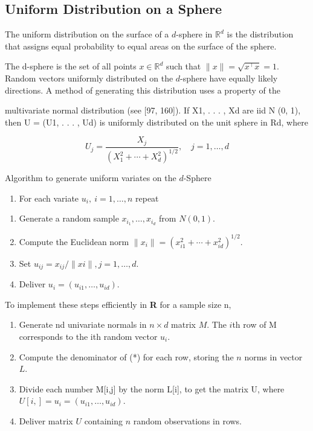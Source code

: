 \documentclass[
  letterpaper,
  DIV=11,
  numbers=noendperiod]{scrreprt}
\providecommand{\tightlist}{%
  \setlength{\itemsep}{0pt}\setlength{\parskip}{0pt}}
\begin{document}
\subsection{Uniform Distribution on a
Sphere}\label{uniform-distribution-on-a-sphere}

The uniform distribution on the surface of a \(d\)-sphere in
\(\mathbb{R}^d\) is the distribution that assigns equal probability to
equal areas on the surface of the sphere.

The d-sphere is the set of all points \(x \in \mathbb{R}^d\) such that
\(\| x \| = \sqrt{x^\top x} = 1\). Random vectors uniformly distributed
on the \(d\)-sphere have equally likely directions. A method of
generating this distribution uses a property of the

multivariate normal distribution (see {[}97, 160{]}). If X1, . . . , Xd
are iid N (0, 1), then U = (U1, . . . , Ud) is uniformly distributed on
the unit sphere in Rd, where

\[
U_j=\frac{X_j}{\left(X_1^2+\cdots+X_d^2\right)^{1 / 2}}, \quad j=1, \ldots, d \tag{*}
\]

Algorithm to generate uniform variates on the \(d\)-Sphere

\begin{enumerate}
\def\labelenumi{\arabic{enumi}.}
\tightlist
\item
  For each variate \(u_i,~ i = 1,\dots , n\) repeat
\end{enumerate}

\begin{enumerate}
\def\labelenumi{(\alph{enumi})}
\item
  Generate a random sample \(x_{i_1}, \dots , x_{i_d}\) from
  \(N (0, 1)\).
\item
  Compute the Euclidean norm
  \(\|x_i\| = (x^2_{i1} + \cdots + x^2_{id})^{1/2}\).
\item
  Set \(u_{ij} = x_{ij} / \|xi\|, j = 1, \dots , d\).
\item
  Deliver \(u_i = (u_{i1}, \dots , u_{id})\).
\end{enumerate}

To implement these steps efficiently in \textbf{R} for a sample size n,

\begin{enumerate}
\def\labelenumi{\arabic{enumi}.}
\item
  Generate nd univariate normals in \(n \times d\) matrix \(M\). The
  \(i\)th row of M corresponds to the ith random vector \(u_i\).
\item
  Compute the denominator of (*) for each row, storing the \(n\) norms
  in vector \(L\).
\item
  Divide each number M{[}i,j{]} by the norm L{[}i{]}, to get the matrix
  U, where \(U[i,] = u_i = (u_{i1}, \dots, u_{id})\).
\item
  Deliver matrix \(U\) containing \(n\) random observations in rows.
\end{enumerate}
\end{document}
